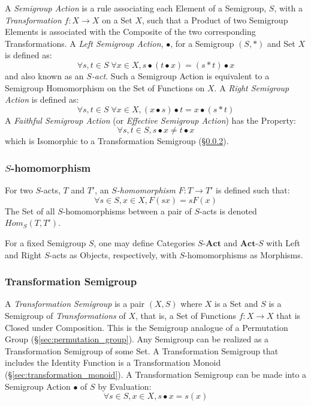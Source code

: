 A \emph{Semigroup Action} is a rule associating each Element of a
Semigroup, $S$, with a \emph{Transformation} $f : X \rightarrow X$ on
a Set $X$, such that a Product of two Semigroup Elements is associated
with the Composite of the two corresponding Transformations. A
\emph{Left Semigroup Action}, $\bullet$, for a Semigroup $(S,*)$ and
Set $X$ is defined as:
\[
  \forall s,t \in S\;\forall x \in X, s \bullet (t \bullet x) = (s * t)
  \bullet x
\]
and also known as an \emph{$S$-act}. Such a Semigroup Action is
equivalent to a Semigroup Homomorphism on the Set of Functions on $X$.
A \emph{Right Semigroup Action} is defined as:
\[
  \forall s,t \in S\;\forall x \in X, (x \bullet s) \bullet t = x
  \bullet (s * t)
\]
A \emph{Faithful Semigroup Action} (or \emph{Effective Semigroup
  Action}) has the Property:
\[
  \forall s, t \in S, s \bullet x \neq t \bullet x
\]
which is Isomorphic to a Transformation Semigroup
(\S\ref{sec:transformation_semigroup}).



\subsubsection{$S$-homomorphism}\label{sec:s_homomorphism}

For two $S$-acts, $T$ and $T'$, an \emph{$S$-homomorphism} $F : T
\rightarrow T'$ is defined such that:
\[
  \forall s \in S, x \in X, F(sx) = sF(x)
\]
The Set of all $S$-homomorphisms between a pair of $S$-acts is denoted
$Hom_S(T,T')$.

For a fixed Semigroup $S$, one may define Categories
$S\text{-}\mathbf{Act}$ and $\mathbf{Act}\text{-}S$ with Left and
Right $S$-acts as Objects, respectively, with $S$-homomorphisms as
Morphisms.



\subsubsection{Transformation Semigroup}\label{sec:transformation_semigroup}

A \emph{Transformation Semigroup} is a pair $(X,S)$ where $X$ is a Set
and $S$ is a Semigroup of \emph{Transformations} of $X$, that is, a
Set of Functions $f : X \rightarrow X$ that is Closed under
Composition. This is the Semigroup analogue of a Permutation Group
(\S\ref{sec:permutation_group}). Any Semigroup can be realized as a
Transformation Semigroup of some Set. A Transformation Semigroup that
includes the Identity Function is a Transformation Monoid
(\S\ref{sec:transformation_monoid}). A Transformation Semigroup can be
made into a Semigroup Action $\bullet$ of $S$ by Evaluation:
\[
  \forall s \in S, x \in X, s \bullet x = s(x)
\]



